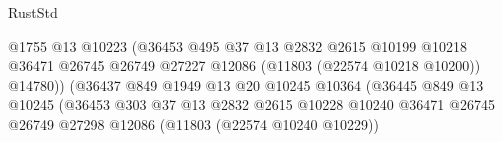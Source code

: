 \begin{lexlean}{RustStd}
\begin{coremodule}
                                                    @1755
                                                    @13
                                                    @10223
                                                    (@36453
                                                      @495
                                                      @37
                                                      @13
                                                      @2832
                                                      @2615
                                                      @10199
                                                      @10218
                                                      @36471
                                                      @26745
                                                      @26749
                                                      @27227
                                                      @12086
                                                      (@11803 (@22574 @10218 @10200))
                                                      @14780))
                                                  (@36437
                                                    @849
                                                    @1949
                                                    @13
                                                    @20
                                                    @10245
                                                    @10364
                                                    (@36445
                                                      @849
                                                      @13
                                                      @10245
                                                      (@36453
                                                        @303
                                                        @37
                                                        @13
                                                        @2832
                                                        @2615
                                                        @10228
                                                        @10240
                                                        @36471
                                                        @26745
                                                        @26749
                                                        @27298
                                                        @12086
                                                        (@11803 (@22574 @10240 @10229))

\end{coremodule}
\end{lexlean}
